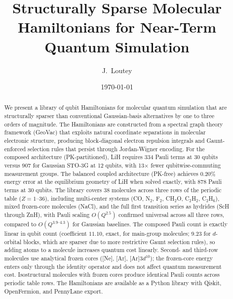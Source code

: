 \documentclass[twocolumn,pra,amsmath,amssymb,superscriptaddress]{revtex4-2}
\begin{document}
\title{Structurally Sparse Molecular Hamiltonians for Near-Term Quantum Simulation}

\author{J.~Loutey}

\date{\today}

\begin{abstract}
We present a library of qubit Hamiltonians for molecular quantum simulation
that are structurally sparser than conventional Gaussian-basis alternatives
by one to three orders of magnitude. The Hamiltonians are constructed from
a spectral graph theory framework (GeoVac) that exploits natural coordinate
separations in molecular electronic structure, producing block-diagonal
electron repulsion integrals and Gaunt-enforced selection rules that persist
through Jordan-Wigner encoding. For the composed architecture (PK-partitioned),
LiH requires 334 Pauli terms at 30 qubits versus 907 for Gaussian STO-3G
at 12 qubits, with 13$\times$ fewer qubitwise-commuting measurement groups.
The balanced coupled architecture (PK-free) achieves 0.20\% energy error
at the equilibrium geometry of LiH when solved exactly, with 878 Pauli terms
at 30 qubits.  The library covers 38 molecules across three rows of the periodic table
($Z=1$--36), including multi-center systems
(CO, N$_2$, F$_2$, CH$_2$O, C$_2$H$_2$, C$_2$H$_6$), mixed
frozen-core molecules (NaCl), and the full first transition series as hydrides (ScH through ZnH),
with Pauli scaling $O(Q^{2.5})$
confirmed universal across all three rows, compared to
$O(Q^{3.9\text{--}4.3})$ for Gaussian baselines.  The composed Pauli
count is exactly linear in qubit count (coefficient $11.10$, exact,
for main-group molecules; $9.23$ for $d$-orbital blocks, which are
sparser due to more restrictive Gaunt selection rules),
so adding atoms to a molecule increases quantum cost linearly.
Second- and third-row molecules use analytical frozen cores
([Ne], [Ar], [Ar]3$d^{10}$); the frozen-core energy enters only
through the identity operator and does not affect quantum measurement
cost.  Isostructural molecules with frozen cores produce identical
Pauli counts across periodic table rows.  The Hamiltonians are available
as a Python library with Qiskit, OpenFermion, and PennyLane export.
\end{abstract}

\maketitle

\end{document}
